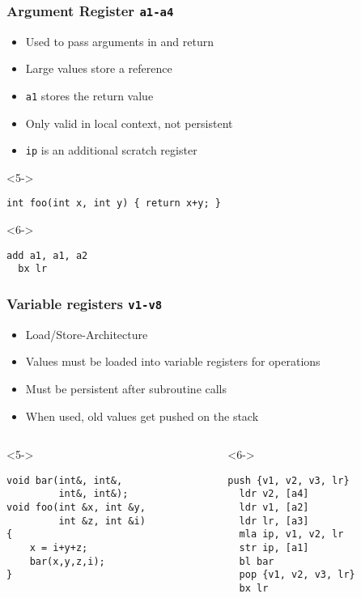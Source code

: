 \documentclass{beamer}
\begin{document}
\begin{frame}[fragile]
\frametitle{Argument Register \lstinline{a1-a4}}
\begin{itemize}
\item<1-> Used to pass arguments in and return
\item<2-> Large values store a reference
\item<3-> \lstinline{a1} stores the return value
\item<4-> Only valid in local context, not persistent
\item<5-> \lstinline{ip} is an additional scratch register
\end{itemize}

\begin{block}<5->{}
\begin{lstlisting}
int foo(int x, int y) { return x+y; }
\end{lstlisting}
\end{block}

\begin{block}<6->{}
\begin{lstlisting}[language=ASM]
  add a1, a1, a2
  bx lr
\end{lstlisting}
\end{block}

\end{frame}

\begin{frame}[fragile]
\frametitle{Variable registers \lstinline{v1-v8}}
\begin{itemize}
\item<1-> Load/Store-Architecture
\item<2-> Values must be loaded into variable registers for operations
\item<3-> Must be persistent after subroutine calls
\item<4-> When used, old values get pushed on the stack
\end{itemize}

\begin{columns}
\begin{column}{0.55\textwidth}
\begin{block}<5->{}
\begin{lstlisting}[basicstyle=\small]
void bar(int&, int&, 
         int&, int&);
void foo(int &x, int &y, 
         int &z, int &i)
{ 
    x = i+y+z; 
    bar(x,y,z,i); 
}\end{lstlisting}
\end{block}
\end{column}
\begin{column}{0.45\textwidth}
\begin{block}<6->{}
\begin{lstlisting}[language=ASM,basicstyle=\small]
  push {v1, v2, v3, lr}
  ldr v2, [a4]
  ldr v1, [a2]
  ldr lr, [a3]
  mla ip, v1, v2, lr
  str ip, [a1]
  bl bar
  pop {v1, v2, v3, lr}
  bx lr
\end{lstlisting}
\end{block}
\end{column}
\end{columns}

\end{frame}
\end{document}
